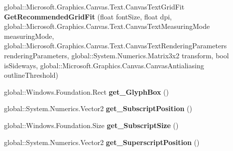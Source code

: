 \begin{DoxyCompactItemize}
\item 
\mbox{\label{interface_microsoft_1_1_graphics_1_1_canvas_1_1_text_1_1_i_canvas_font_face_a700fd530e12faeab7d0ece47575bf53c}} 
global\+::\+Microsoft.\+Graphics.\+Canvas.\+Text.\+Canvas\+Text\+Grid\+Fit {\bfseries Get\+Recommended\+Grid\+Fit} (float font\+Size, float dpi, global\+::\+Microsoft.\+Graphics.\+Canvas.\+Text.\+Canvas\+Text\+Measuring\+Mode measuring\+Mode, global\+::\+Microsoft.\+Graphics.\+Canvas.\+Text.\+Canvas\+Text\+Rendering\+Parameters rendering\+Parameters, global\+::\+System.\+Numerics.\+Matrix3x2 transform, bool is\+Sideways, global\+::\+Microsoft.\+Graphics.\+Canvas.\+Canvas\+Antialiasing outline\+Threshold)
\item 
\mbox{\label{interface_microsoft_1_1_graphics_1_1_canvas_1_1_text_1_1_i_canvas_font_face_a11e8a01b93a2d69e738b14657ffc3bcd}} 
global\+::\+Windows.\+Foundation.\+Rect {\bfseries get\+\_\+\+Glyph\+Box} ()
\item 
\mbox{\label{interface_microsoft_1_1_graphics_1_1_canvas_1_1_text_1_1_i_canvas_font_face_ab4541373ee5f87b502a72f5becd9f8d2}} 
global\+::\+System.\+Numerics.\+Vector2 {\bfseries get\+\_\+\+Subscript\+Position} ()
\item 
\mbox{\label{interface_microsoft_1_1_graphics_1_1_canvas_1_1_text_1_1_i_canvas_font_face_a0c1d3ab35db8ce04880d4ce5b17bf225}} 
global\+::\+Windows.\+Foundation.\+Size {\bfseries get\+\_\+\+Subscript\+Size} ()
\item 
\mbox{\label{interface_microsoft_1_1_graphics_1_1_canvas_1_1_text_1_1_i_canvas_font_face_a6e031a137834ed28d7834af308d46ce5}} 
global\+::\+System.\+Numerics.\+Vector2 {\bfseries get\+\_\+\+Superscript\+Position} ()
\item 
\mbox{\label{interface_microsoft_1_1_graphics_1_1_canvas_1_1_text_1_1_i_canvas_font_face_aa7ccdba10b59ebd2b95e00f99265a403}} 

\end{DoxyCompactItemize}
